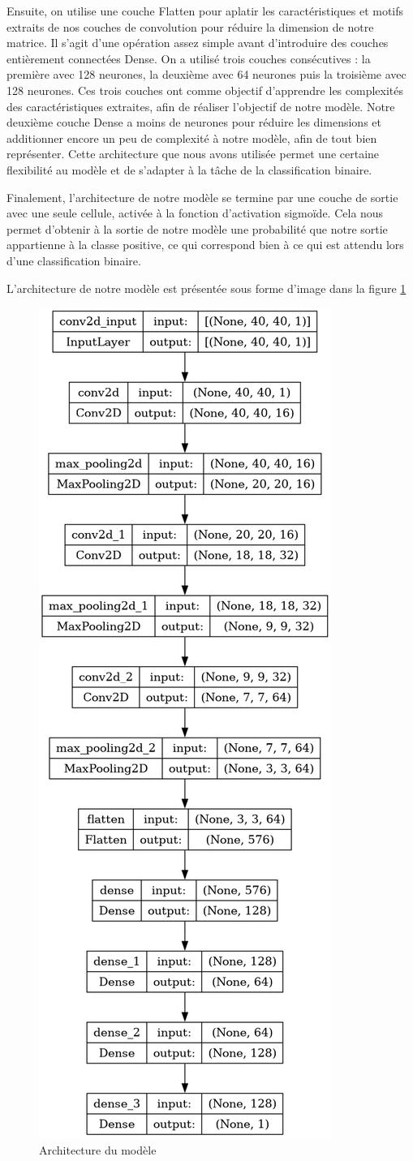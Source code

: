 \documentclass[11pt, parskip=half]{scrartcl} %
\begin{document}
Ensuite, on utilise une couche Flatten pour aplatir les caractéristiques et motifs extraits de nos couches de convolution pour réduire la dimension de notre matrice. Il s’agit d’une opération assez simple avant d’introduire des couches entièrement connectées Dense. On a utilisé trois couches consécutives : la première avec 128 neurones, la deuxième avec 64 neurones puis la troisième avec 128 neurones. Ces trois couches ont comme objectif d’apprendre les complexités des caractéristiques extraites, afin de réaliser l’objectif de notre modèle. Notre deuxième couche Dense a moins de neurones pour réduire les dimensions et additionner encore un peu de complexité à notre modèle, afin de tout bien représenter. Cette architecture que nous avons utilisée permet une certaine flexibilité au modèle et de s’adapter à la tâche de la classification binaire.

Finalement, l’architecture de notre modèle se termine par une couche de sortie avec une seule cellule, activée à la fonction d’activation sigmoïde. Cela nous permet d’obtenir à la sortie de notre modèle une probabilité que notre sortie appartienne à la classe positive, ce qui correspond bien à ce qui est attendu lors d’une classification binaire.

L’architecture de notre modèle est présentée sous forme d’image dans la figure \ref{fig:model}

\begin{figure}
	\centering
	\includegraphics[width=0.4\linewidth]{./figures/model.png}
	\caption{Architecture du modèle}
	\label{fig:model}
\end{figure}
\end{document}
